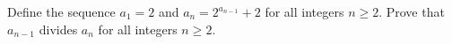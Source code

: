 Define the sequence $a_1 = 2$ and $a_n = 2^{a_{n-1}} + 2$ for all integers $n \ge 2$. Prove that $a_{n-1}$ divides $a_n$ for all integers $n \ge 2$.